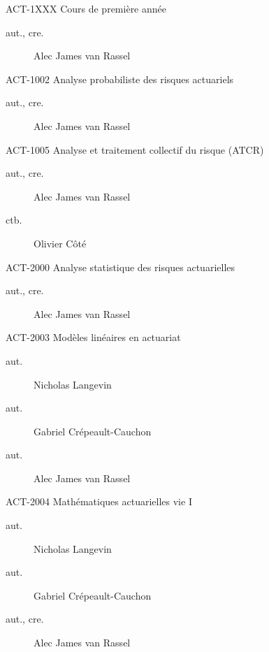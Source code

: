 \documentclass[10pt, french]{article}
\begin{document}
\begin{multicols*}{2}

\begin{contrib}{ACT-1XXX\: Cours de première année}
\begin{description}
	\item[aut., cre.] Alec James van Rassel
\end{description}
\end{contrib}

\begin{contrib}{ACT-1002\: Analyse probabiliste des risques actuariels}
\begin{description}
	\item[aut., cre.] Alec James van Rassel
\end{description}
\end{contrib}

\begin{contrib}{ACT-1005\: Analyse et traitement collectif du risque (ATCR)}
\begin{description}
	\item[aut., cre.] Alec James van Rassel
	\item[ctb.]	Olivier Côté
\end{description}
\end{contrib}

\begin{contrib}{ACT-2000\: Analyse statistique des risques actuarielles}
\begin{description}
	\item[aut., cre.] Alec James van Rassel
\end{description}
\end{contrib}

\begin{contrib}{ACT-2003\: Modèles linéaires en actuariat}
\begin{description}
	\item[aut.] Nicholas Langevin
	\item[aut.] Gabriel Crépeault-Cauchon 
	\item[aut.] Alec James van Rassel
\end{description}
\end{contrib}

\begin{contrib}{ACT-2004\: Mathématiques actuarielles vie I}
\begin{description}
	\item[aut.] Nicholas Langevin
	\item[aut.] Gabriel Crépeault-Cauchon 
	\item[aut., cre.] Alec James van Rassel
\end{description}
\end{contrib}


\end{multicols*}
\end{document}

